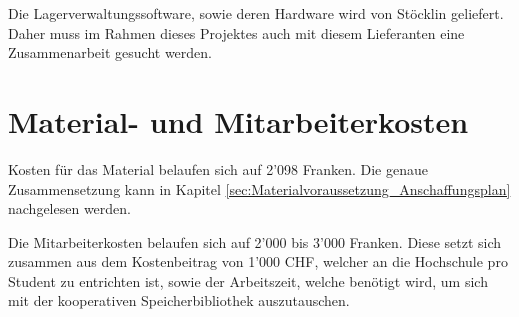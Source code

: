 Die Lagerverwaltungssoftware, sowie deren Hardware wird von Stöcklin geliefert. Daher muss im Rahmen dieses Projektes auch mit diesem Lieferanten eine Zusammenarbeit gesucht werden.

\section{Material- und Mitarbeiterkosten}
Kosten für das Material belaufen sich auf 2'098 Franken. Die genaue Zusammensetzung kann in Kapitel \ref{sec:Materialvoraussetzung_Anschaffungsplan} nachgelesen werden.

Die Mitarbeiterkosten belaufen sich auf 2'000 bis 3'000 Franken. Diese setzt sich zusammen aus dem Kostenbeitrag von 1'000 CHF, welcher an die Hochschule pro Student zu entrichten ist, sowie der Arbeitszeit, welche benötigt wird, um sich mit der kooperativen Speicherbibliothek auszutauschen.
